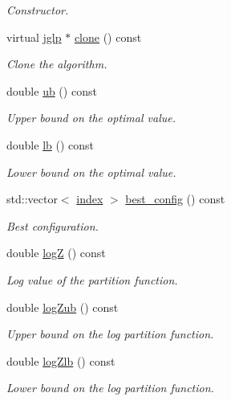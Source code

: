 \begin{DoxyCompactItemize}
\begin{DoxyCompactList}\small\item\em Constructor. \end{DoxyCompactList}\item 
virtual \hyperlink{classmerlin_1_1jglp}{jglp} $\ast$ \hyperlink{classmerlin_1_1jglp_af6e5931262caafec1aab81f6d3001419}{clone} () const 
\begin{DoxyCompactList}\small\item\em Clone the algorithm. \end{DoxyCompactList}\item 
double \hyperlink{classmerlin_1_1jglp_aeb00e60c9df427722f2ff791bdd056d9}{ub} () const 
\begin{DoxyCompactList}\small\item\em Upper bound on the optimal value. \end{DoxyCompactList}\item 
double \hyperlink{classmerlin_1_1jglp_a56a4aa254f07ee4a651bf343ee14d63b}{lb} () const 
\begin{DoxyCompactList}\small\item\em Lower bound on the optimal value. \end{DoxyCompactList}\item 
std\+::vector$<$ \hyperlink{classmerlin_1_1graph_a5cade38832f47248573e921276f122d6}{index} $>$ \hyperlink{classmerlin_1_1jglp_a4e7ff17be5074ce9010fda0154f81fbf}{best\+\_\+config} () const 
\begin{DoxyCompactList}\small\item\em Best configuration. \end{DoxyCompactList}\item 
double \hyperlink{classmerlin_1_1jglp_a2a6a565403cbddd77109a3a6f85e3d35}{logZ} () const 
\begin{DoxyCompactList}\small\item\em Log value of the partition function. \end{DoxyCompactList}\item 
double \hyperlink{classmerlin_1_1jglp_a6f964c4acb649a3bf24bd46e8c414113}{log\+Zub} () const 
\begin{DoxyCompactList}\small\item\em Upper bound on the log partition function. \end{DoxyCompactList}\item 
double \hyperlink{classmerlin_1_1jglp_a53e258c9ac8e80e2a99019f350fafe23}{log\+Zlb} () const 
\begin{DoxyCompactList}\small\item\em Lower bound on the log partition function. \end{DoxyCompactList}\item 

\end{DoxyCompactItemize}
